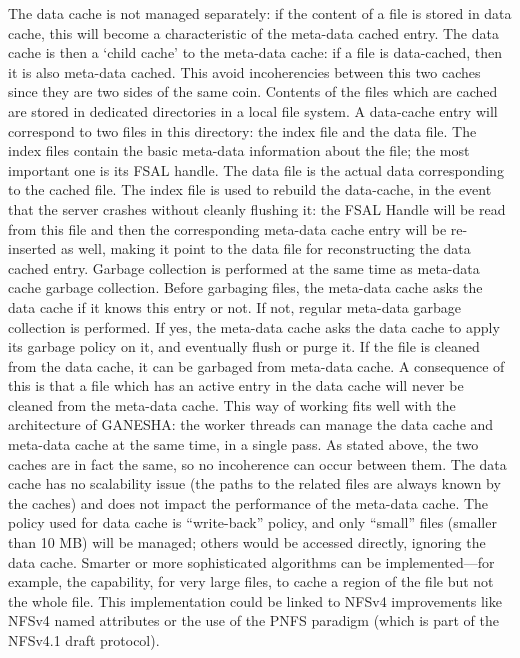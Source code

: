 \documentclass[final]{ols}
\begin{document}
The data cache is not managed separately: if the content of a file is
stored in data cache, this will become a characteristic of the
meta-data cached entry. The data cache is then a `child cache' to the
meta-data cache: if a file is data-cached, then it is also meta-data
cached. This avoid incoherencies between this two caches since they are
two sides of the same coin.  Contents of the files which are cached
are stored in dedicated directories in a local file system. A
data-cache entry will correspond to two files in this directory: the
index file and the data file. The index files contain the basic meta-data
information about the file; the most important one is its FSAL handle.
The data file is the actual data corresponding to the cached file. The
index file is used to rebuild the data-cache, in the event that the
server crashes
without cleanly flushing it: the FSAL Handle will be read from this
file and then the corresponding meta-data cache entry will be
re-inserted as well, making it point to the data file for
reconstructing the data cached entry.  Garbage collection is performed
at the same time as meta-data cache garbage collection. Before
garbaging files, the meta-data cache asks the data cache if it knows
this entry or not. If not, regular meta-data garbage collection is
performed. If yes, the meta-data cache asks the data cache to apply its
garbage policy on it, and eventually flush or purge it. If the file is
cleaned from the data cache, it can be garbaged from meta-data cache. A
consequence of this is that a file which has an active entry in the
data cache will never be cleaned from the meta-data cache.  This way
of working fits well with the architecture of GANESHA: the worker
threads can manage the data cache and meta-data cache at the same time, in
a single pass. As stated above, the two caches are in fact the same,
so no incoherence can occur between them. The data cache has no
scalability issue (the paths to the related files are always known by
the caches) and does not impact the performance of the meta-data
cache.  The policy used for data cache is ``write-back'' policy, and only
``small'' files (smaller than 10 MB) will be managed; others would be
accessed directly, ignoring the data cache.  Smarter or more
sophisticated algorithms can be implemented---for example, the
capability, for very large files, to cache a region of the file but
not the whole file.  This implementation could be linked to NFSv4
improvements like NFSv4 named attributes or the use of the PNFS
paradigm (which is part of the NFSv4.1 draft protocol).
\end{document}
